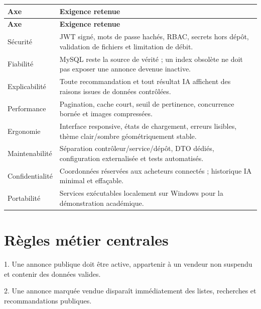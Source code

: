 {\small\singlespacing{}
\begin{longtable}{|>{\raggedright\arraybackslash}p{}|>{\raggedright\arraybackslash}p{}|}
\hline
\rowcolor{tablehead} \color{white}\bfseries Axe & \color{white}\bfseries Exigence retenue \\ \hline
\endfirsthead
\rowcolor{tablehead} \color{white}\bfseries Axe & \color{white}\bfseries Exigence retenue \\ \hline
\endhead
\hline\endfoot
Sécurité & JWT signé, mots de passe hachés, RBAC, secrets hors dépôt, validation de fichiers et limitation de débit. \\ \hline
\rowcolor{tablerow} Fiabilité & MySQL reste la source de vérité ; un index obsolète ne doit pas exposer une annonce devenue inactive. \\ \hline
Explicabilité & Toute recommandation et tout résultat IA affichent des raisons issues de données contrôlées. \\ \hline
\rowcolor{tablerow} Performance & Pagination, cache court, seuil de pertinence, concurrence bornée et images compressées. \\ \hline
Ergonomie & Interface responsive, états de chargement, erreurs lisibles, thème clair/sombre géométriquement stable. \\ \hline
\rowcolor{tablerow} Maintenabilité & Séparation contrôleur/service/dépôt, DTO dédiés, configuration externalisée et tests automatisés. \\ \hline
Confidentialité & Coordonnées réservées aux acheteurs connectés ; historique IA minimal et effaçable. \\ \hline
\rowcolor{tablerow} Portabilité & Services exécutables localement sur Windows pour la démonstration académique. \\ \hline
\end{longtable}
}


\section{Règles métier centrales}

1. Une annonce publique doit être active, appartenir à un vendeur non suspendu et contenir des données valides.


2. Une annonce marquée vendue disparaît immédiatement des listes, recherches et recommandations publiques.


